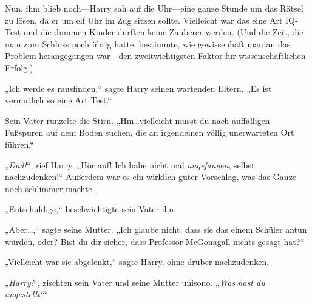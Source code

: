 Nun, ihm blieb noch—Harry sah auf die Uhr—eine ganze Stunde um das Rätsel zu lösen, da er um elf Uhr im Zug sitzen sollte. Vielleicht war das eine Art IQ-Test und die dummen Kinder durften keine Zauberer werden. (Und die Zeit, die man zum Schluss noch übrig hatte, bestimmte, wie gewissenhaft man an das Problem herangegangen war—den zweitwichtigsten Faktor für wissenschaftlichen Erfolg.)

„Ich werde es rausfinden,“ sagte Harry seinen wartenden Eltern. „Es ist vermutlich so eine Art Test.“

Sein Vater runzelte die Stirn. „Hm…vielleicht musst du nach auffälligen Fußspuren auf dem Boden suchen, die an irgendeinen völlig unerwarteten Ort führen.“

„\emph{Dad!}“, rief Harry. „Hör auf! Ich habe nicht mal \emph{angefangen}, selbst nachzudenken!“ Außerdem war es ein wirklich guter Vorschlag, was das Ganze noch schlimmer machte.

„Entschuldige,“ beschwichtigte sein Vater ihn.

„Aber…,“ sagte seine Mutter. „Ich glaube nicht, dass sie das einem Schüler antun würden, oder? Bist du dir sicher, dass Professor McGonagall nichts gesagt hat?“

„Vielleicht war sie abgelenkt,“ sagte Harry, ohne drüber nachzudenken.

„\emph{Harry!}“, zischten sein Vater und seine Mutter unisono. „\emph{Was hast du angestellt?}“

